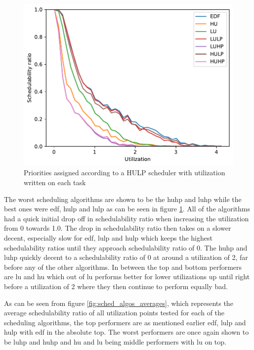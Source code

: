 \documentclass{kththesis}
\begin{document}
\begin{figure}[H]

    \centering

    \includegraphics[width=1.0\linewidth]{images/sched_algos.pdf}

    \caption{Priorities assigned according to a HULP scheduler with utilization written on each task}

    \label{fig:sched_algos}

\end{figure}

The worst scheduling algorithms are shown to be the \acrshort{huhp} and \acrshort{luhp} while the
best ones were \acrshort{edf}, \acrshort{hulp} and \acrshort{lulp} as can be seen in figure
\ref{fig:sched_algos}. All of the algorithms had a quick initial drop off in schedulability ratio
when increasing the utilization from 0 towards 1.0. The drop in schedulability ratio then takes on a
slower decent, especially slow for \acrshort{edf}, \acrshort{lulp} and \acrshort{hulp} which keeps
the highest schedulability ratios until they approach schedulability ratio of 0. The \acrshort{huhp}
and \acrshort{luhp} quickly decent to a schedulability ratio of 0 at around a utilization of 2, far
before any of the other algorithms. In between the top and bottom performers are \acrshort{lu} and
\acrshort{hu} which out of \acrshort{lu} performs better for lower utilizations up until right
before a utilization of 2 where they then continue to perform equally bad.

As can be seen from figure \ref{fig:sched_algos_averages}, which represents the average
schedulability ratio of all utilization points tested for each of the scheduling algorithms, the top
performers are as mentioned earlier \acrshort{edf}, \acrshort{lulp} and \acrshort{hulp} with
\acrshort{edf} in the absolute top. The worst performers are once again shown to be \acrshort{luhp}
and \acrshort{huhp} and \acrshort{hu} and \acrshort{lu} being middle performers with \acrshort{lu}
on top.
\end{document}
